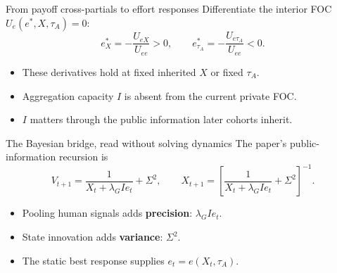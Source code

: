 \documentclass[11pt,aspectratio=169]{beamer}
\begin{document}
\begin{frame}{From payoff cross-partials to effort responses}
Differentiate the interior FOC $U_e(e^*,X,\tau_A)=0$:
\[
 e_X^*=-\frac{U_{eX}}{U_{ee}}>0,
 \qquad e_{\tau_A}^*=-\frac{U_{e\tau_A}}{U_{ee}}<0.
\]
\begin{itemize}\setlength\itemsep{3mm}
\item These derivatives hold at fixed inherited $X$ or fixed $\tau_A$.
\item Aggregation capacity $I$ is absent from the current private FOC.
\item $I$ matters through the public information later cohorts inherit.
\end{itemize}
\end{frame}

\begin{frame}{The Bayesian bridge, read without solving dynamics}
The paper's public-information recursion is
\[
V_{t+1}=\frac{1}{X_t+\lambda_G I e_t}+\Sigma^2,
\qquad
X_{t+1}=\left[\frac{1}{X_t+\lambda_G I e_t}+\Sigma^2\right]^{-1}.
\]
\begin{itemize}\setlength\itemsep{4mm}
\item Pooling human signals adds \textbf{precision}: $\lambda_G I e_t$.
\item State innovation adds \textbf{variance}: $\Sigma^2$.
\item The static best response supplies $e_t=e(X_t,\tau_A)$.
\end{itemize}
\end{frame}
\end{document}
